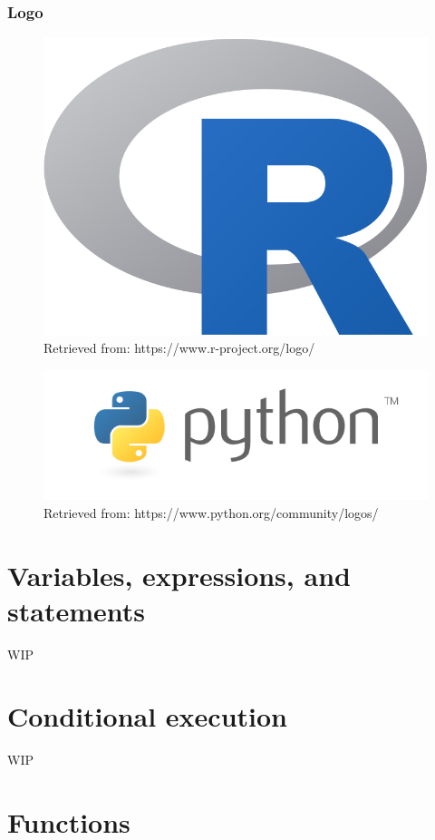 \documentclass[]{book}
\begin{document}
\hypertarget{logo}{%
\subsection{Logo}\label{logo}}

\begin{figure}

{\centering \includegraphics[width=0.3\linewidth]{fig/C1_Rlogo} 

}

\caption{Retrieved from: https://www.r-project.org/logo/}\label{fig:unnamed-chunk-1}
\end{figure}

\begin{figure}

{\centering \includegraphics[width=0.6\linewidth]{fig/C1_Pythonlogo} 

}

\caption{Retrieved from: https://www.python.org/community/logos/}\label{fig:unnamed-chunk-2}
\end{figure}

\hypertarget{variables-expressions-and-statements}{%
\chapter{Variables, expressions, and statements}\label{variables-expressions-and-statements}}

WIP

\hypertarget{conditional-execution}{%
\chapter{Conditional execution}\label{conditional-execution}}

WIP

\hypertarget{functions}{%
\chapter{Functions}\label{functions}}
\end{document}
